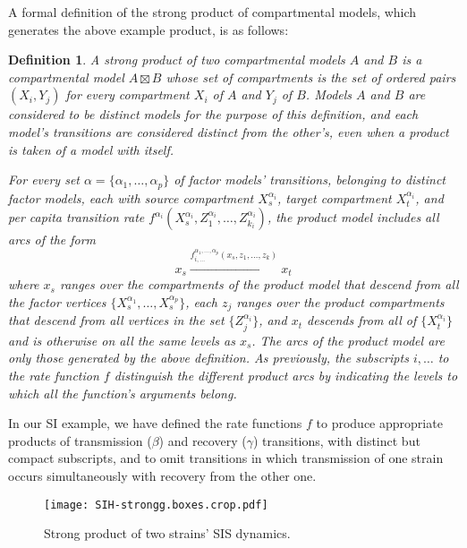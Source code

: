 \documentclass[review]{elsarticle}
\newtheorem*{definition}{Definition}
\begin{document}
A formal definition of the strong product of compartmental
models, which generates the above example product, is as follows:

\begin{definition}  A strong product of two
compartmental models $A$ and $B$ is a compartmental
model $A\boxtimes B$ whose set of compartments is
the set of ordered pairs $(X_i,Y_j)$ for every compartment $X_i$
of $A$ and $Y_j$ of $B$.
Models $A$ and $B$ are considered to be distinct models for the
purpose of this definition, and each model's transitions are considered distinct
from the other's, even when a product is taken of a model with itself.

For every set $\alpha=\{\alpha_1,\ldots,\alpha_p\}$ of factor models' transitions,
belonging to distinct factor models,
each with
source compartment $X^{\alpha_i}_s$, target compartment $X^{\alpha_i}_t$,
and per capita transition rate
$f^{\alpha_i}(X^{\alpha_i}_s,Z^{\alpha_i}_1,\ldots,Z^{\alpha_i}_{k_i})$,
the product model includes all arcs of the form
\[ x_s \xrightarrow{f^{\alpha_1,\ldots,\alpha_p}_{i,\ldots}(x_s,z_{1},\ldots,z_{k})} x_t \]
where $x_s$ ranges over the compartments of the product model
that descend from all the factor vertices
$\{X^{\alpha_1}_s,\ldots,X^{\alpha_p}_s\}$,
each $z_j$ ranges over the product compartments
that descend from all vertices in the set $\{Z^{\alpha_i}_j\}$,
and $x_t$ descends from all of $\{X^{\alpha_i}_t\}$ and
is otherwise on all the same levels as $x_s$.
The arcs of the product model are only those generated by the
above definition.
As previously, the subscripts $i,\ldots$ to the rate function $f$
distinguish the different product arcs by indicating the levels to which
all the function's arguments belong.
\end{definition}

In our SI example, we have defined the rate functions $f$ to
produce appropriate products of
transmission ($\beta$) and recovery ($\gamma$)
transitions, with distinct but compact subscripts,
and to omit transitions in which transmission of one strain
occurs simultaneously with recovery from the other one.



\begin{figure}
\centering
\texttt{[image: SIH-strongg.boxes.crop.pdf]}

\caption{ \label{fig:strong}
Strong product of two strains' SIS dynamics.
}
\end{figure}
\end{document}
